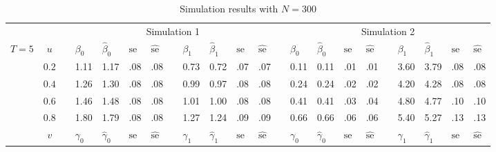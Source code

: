 \documentclass[12pt]{article}
\begin{document}

\begin{sidewaystable}
\footnotesize
\caption{Simulation results with $N = 300$}
\label{sim300}
\centering
\begin{tabular}{cc
m{0.01cm}m{0.45cm}m{0.45cm}m{0.2cm}m{0.2cm}
m{0.01cm}m{0.45cm}m{0.45cm}m{0.2cm}m{0.2cm}
m{0.01cm}m{0.45cm}m{0.45cm}m{0.2cm}m{0.2cm}
m{0.01cm}m{0.45cm}m{0.45cm}m{0.2cm}m{0.2cm}
}
\hline
\hline
&&& \multicolumn{9}{c}{Simulation 1} & & \multicolumn{9}{c}{Simulation 2}\\
\cline{4-12}\cline{14-22}
$T = 5$ & $u$ && 
	$\beta_0$ & $\hat\beta_0$ & $\text{se}$ & $\hat{\text{se}}$ &&
	$\beta_1$ & $\hat\beta_1$ & $\text{se}$ & $\hat{\text{se}}$ &&
	$\beta_0$ & $\hat\beta_0$ & $\text{se}$ & $\hat{\text{se}}$ &&
	$\beta_1$ & $\hat\beta_1$ & $\text{se}$ & $\hat{\text{se}}$\\
\cline{4-7}\cline{9-12}\cline{14-17}\cline{19-22}
& $0.2$ && 1.11 & 1.17 & .08 & .08	&& 0.73 & 0.72 & .07 & .07	&& 0.11 & 0.11 & .01 & .01	&& 3.60 & 3.79 & .08 & .08\\
& $0.4$ && 1.26 & 1.30 & .08 & .08	&& 0.99 & 0.97 & .08 & .08	&& 0.24 & 0.24 & .02 & .02	&& 4.20 & 4.28 & .08 & .08\\
& $0.6$ && 1.46 & 1.48 & .08 & .08	&& 1.01 & 1.00 & .08 & .08	&& 0.41 & 0.41 & .03 & .04	&& 4.80 & 4.77 & .10 & .10\\
& $0.8$ && 1.80 & 1.79 & .08 & .08	&& 1.27 & 1.24 & .09 & .09	&& 0.66 & 0.66 & .06 & .06	&& 5.40 & 5.27 & .13 & .13\\
& $v$ && 
	$\gamma_0$ & $\hat\gamma_0$ & $\text{se}$ & $\hat{\text{se}}$ &&
	$\gamma_1$ & $\hat\gamma_1$ & $\text{se}$ & $\hat{\text{se}}$ &&
	$\gamma_0$ & $\hat\gamma_0$ & $\text{se}$ & $\hat{\text{se}}$ &&
	$\gamma_1$ & $\hat\gamma_1$ & $\text{se}$ & $\hat{\text{se}}$\\
\cline{4-7}\cline{9-12}\cline{14-17}\cline{19-22}

\end{tabular}
\end{sidewaystable}
\end{document}
